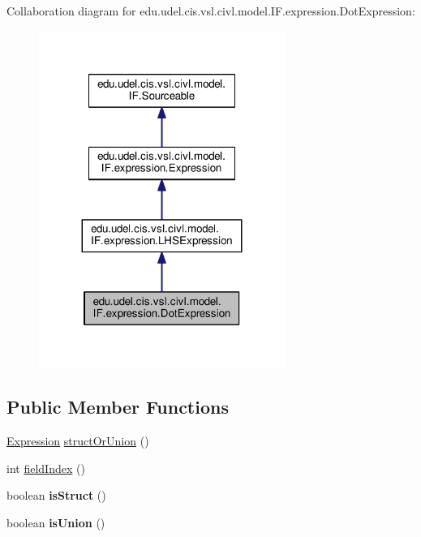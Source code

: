 Collaboration diagram for edu.\+udel.\+cis.\+vsl.\+civl.\+model.\+I\+F.\+expression.\+Dot\+Expression\+:
\nopagebreak
\begin{figure}[H]
\begin{center}
\leavevmode
\includegraphics[width=227pt]{interfaceedu_1_1udel_1_1cis_1_1vsl_1_1civl_1_1model_1_1IF_1_1expression_1_1DotExpression__coll__graph}
\end{center}
\end{figure}
\subsection*{Public Member Functions}
\begin{DoxyCompactItemize}
\item 
\hyperlink{interfaceedu_1_1udel_1_1cis_1_1vsl_1_1civl_1_1model_1_1IF_1_1expression_1_1Expression}{Expression} \hyperlink{interfaceedu_1_1udel_1_1cis_1_1vsl_1_1civl_1_1model_1_1IF_1_1expression_1_1DotExpression_a4dae8334848faf8f011147ebcfc2843f}{struct\+Or\+Union} ()
\item 
int \hyperlink{interfaceedu_1_1udel_1_1cis_1_1vsl_1_1civl_1_1model_1_1IF_1_1expression_1_1DotExpression_a566cd9699e663e424d85cf807f510480}{field\+Index} ()
\item 
\hypertarget{interfaceedu_1_1udel_1_1cis_1_1vsl_1_1civl_1_1model_1_1IF_1_1expression_1_1DotExpression_a806f6dbdb67b357f3f10556306b36267}{}boolean {\bfseries is\+Struct} ()\label{interfaceedu_1_1udel_1_1cis_1_1vsl_1_1civl_1_1model_1_1IF_1_1expression_1_1DotExpression_a806f6dbdb67b357f3f10556306b36267}

\item 
\hypertarget{interfaceedu_1_1udel_1_1cis_1_1vsl_1_1civl_1_1model_1_1IF_1_1expression_1_1DotExpression_aa18a00660abc8103cd104fdfbc82a798}{}boolean {\bfseries is\+Union} ()\label{interfaceedu_1_1udel_1_1cis_1_1vsl_1_1civl_1_1model_1_1IF_1_1expression_1_1DotExpression_aa18a00660abc8103cd104fdfbc82a798}

\end{DoxyCompactItemize}


